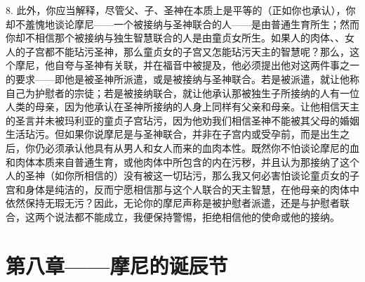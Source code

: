 8. 此外，你应当解释，尽管父、子、圣神在本质上是平等的（正如你也承认），你却不羞愧地谈论摩尼——一个被接纳与圣神联合的人——是由普通生育所生；然而你却不相信那个被接纳与独生智慧联合的人是由童贞女所生。如果人的肉体、、女人的子宫都不能玷污圣神，那么童贞女的子宫又怎能玷污天主的智慧呢？那么，这个摩尼，他自夸与圣神有关联，并在福音中被提及，他必须提出他对这两件事之一的要求——即他是被圣神所派遣，或是被接纳与圣神联合。若是被派遣，就让他称自己为护慰者的宗徒；若是被接纳联合，就让他承认那被独生子所接纳的人有一位人类的母亲，因为他承认在圣神所接纳的人身上同样有父亲和母亲。让他相信天主的圣言并未被玛利亚的童贞子宫玷污，因为他劝我们相信圣神不能被其父母的婚姻生活玷污。但如果你说摩尼是与圣神联合，并非在子宫内或受孕前，而是出生之后，你仍必须承认他具有从男人和女人而来的血肉本性。既然你不怕谈论摩尼的血和肉体本质来自普通生育，或他肉体中所包含的内在污秽，并且认为那接纳了这个人的圣神（如你所相信的）没有被这一切玷污，那么我又何必害怕谈论童贞女的子宫和身体是纯洁的，反而宁愿相信那与这个人联合的天主智慧，在他母亲的肉体中依然保持无瑕无污？因此，无论你的摩尼声称是被护慰者派遣，还是与护慰者联合，这两个说法都不能成立，我便保持警惕，拒绝相信他的使命或他的接纳。\par


\section{第八章——摩尼的诞辰节}

